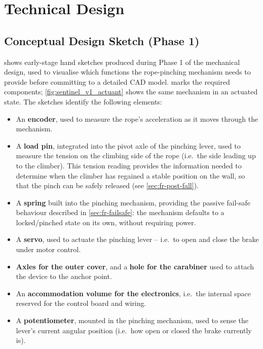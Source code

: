 
\chapter{Technical Design}
\label{ch:technical-design}


\section{Conceptual Design Sketch (Phase 1)}
\label{sec:design-sketch-phase1}

 shows early-stage hand sketches produced
during Phase 1 of the mechanical design, used to visualise which
functions the rope-pinching mechanism needs to provide before committing
to a detailed CAD model.  marks the required
components; \cref{fig:sentinel_v1_actuant} shows the same mechanism in an
actuated state. The sketches identify the following elements:

\begin{itemize}
    \item An \textbf{encoder}, used to measure the rope's acceleration as
        it moves through the mechanism.
    \item A \textbf{load pin}, integrated into the pivot axle of the
        pinching lever, used to measure the tension on the climbing side
        of the rope (i.e.\ the side leading up to the climber). This
        tension reading provides the information needed to determine
        when the climber has regained a stable position on the wall, so
        that the pinch can be safely released (see
        \cref{sec:fr-post-fall}).
    \item A \textbf{spring} built into the pinching mechanism, providing
        the passive fail-safe behaviour described in
        \cref{sec:fr-failsafe}: the mechanism defaults to a locked/pinched
        state on its own, without requiring power.
    \item A \textbf{servo}, used to actuate the pinching lever -- i.e.\
        to open and close the brake under motor control.
    \item \textbf{Axles for the outer cover}, and a \textbf{hole for the
        carabiner} used to attach the device to the anchor point.
    \item An \textbf{accommodation volume for the electronics}, i.e.\ the
        internal space reserved for the control board and wiring.
    \item A \textbf{potentiometer}, mounted in the pinching mechanism, used
        to sense the lever's current angular position (i.e.\ how open or
        closed the brake currently is).
\end{itemize}

